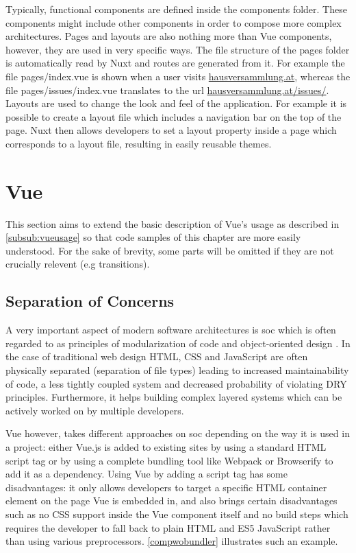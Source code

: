 Typically, functional components are defined inside the components folder. These components might include other components in order to compose more complex architectures. Pages and layouts are also nothing more than Vue components, however, they are used in very specific ways. The file structure of the pages folder is automatically read by Nuxt and routes are generated from it. For example the file pages/index.vue is shown when a user visits \url{hausversammlung.at}, whereas the file pages/issues/index.vue translates to the url \url{hausversammlung.at/issues/}. Layouts are used to change the look and feel of the application. For example it is possible to create a layout file which includes a navigation bar on the top of the page. Nuxt then allows developers to set a layout property inside a page which corresponds to a layout file, resulting in easily reusable themes. 

\section{Vue}
This section aims to extend the basic description of Vue's usage as described in \autoref{subsub:vueusage} so that code samples of this chapter are more easily understood. For the sake of brevity, some parts will be omitted if they are not crucially relevent (e.g transitions). 

\subsection{Separation of Concerns}
A very important aspect of modern software architectures is \acrfull{soc} which is often regarded to as principles of modularization of code and object-oriented design \cite{laplante2007every:book}. In the case of traditional web design HTML, CSS and JavaScript are often physically separated (separation of file types) leading to increased maintainability of code, a less tightly coupled system and decreased probability of violating DRY principles. Furthermore, it helps building complex layered systems which can be actively worked on by multiple developers. 

Vue however, takes different approaches on \acrshort{soc} depending on the way it is used in a project:
either Vue.js is added to existing sites by using a standard HTML script tag or by using a complete bundling tool like Webpack or Browserify to add it as a dependency. Using Vue by adding a script tag has some disadvantages: it only allows developers to target a specific HTML container element on the page Vue is embedded in, and also brings certain disadvantages such as no CSS support inside the Vue component itself and no build steps which requires the developer to fall back to plain HTML and ES5 JavaScript rather than using various preprocessors. \autoref{compwobundler} illustrates such an example.


